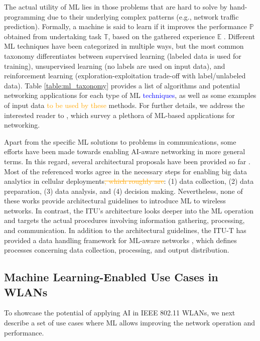 \documentclass[journal]{IEEEtran}
\begin{document}
The actual utility of ML lies in those problems that are hard to solve by hand-programming due to their underlying complex patterns (e.g., network traffic prediction). Formally, a machine is said to learn if it improves the performance $\mathbb{P}$ obtained from undertaking task $\mathbb{T}$, based on the gathered experience $\mathbb{E}$ \cite{mitchell1997machine}. Different ML techniques have been categorized in multiple ways, but the most common taxonomy differentiates between supervised learning (labeled data is used for training), unsupervised learning (no labels are used on input data), and reinforcement learning (exploration-exploitation trade-off with label/unlabeled data). Table \ref{table:ml_taxonomy} provides a list of algorithms and potential networking applications for each type of ML \textcolor{blue}{techniques}, as well as some examples of input data  \textcolor{orange}{to be used by these} methods. For further details, we address the interested reader to \cite{jiang2016machine, zhang2019deep, usama2019unsupervised}, which survey a plethora of ML-based applications for networking.

Apart from the specific ML solutions to problems in communications, some efforts have been made towards enabling AI-aware networking in more general terms. In this regard, several architectural proposals have been provided so far \cite{bi2015wireless,chih2017big,wang2018machine}. Most of the referenced works agree in the necessary steps for enabling big data analytics in cellular deployments\textcolor{orange}{\st{, which roughly are}}: (1) data collection, (2) data preparation, (3) data analysis, and (4) decision making. Nevertheless, none of these works provide architectural guidelines to introduce ML to wireless networks. In contrast, the ITU's architecture looks deeper into the ML operation and targets the actual procedures involving information gathering, processing, and communication. In addition to the architectural guidelines, the ITU-T has provided a data handling framework for ML-aware networks \cite{itu2019data}, which defines processes concerning data collection, processing, and output distribution. 

\subsection{Machine Learning-Enabled Use Cases in WLANs}
To showcase the potential of applying AI in IEEE 802.11 WLANs, we next describe a set of use cases where ML allows improving the network operation and performance.
\end{document}
